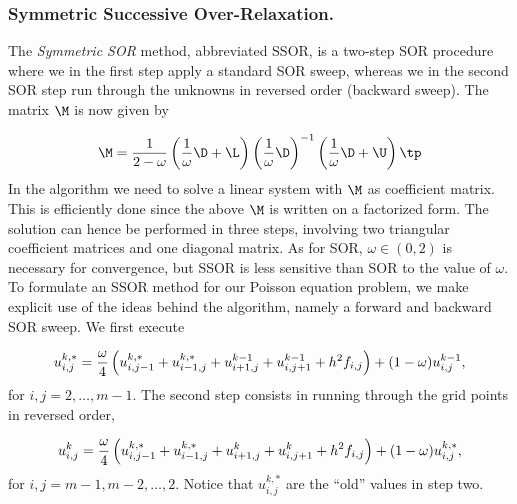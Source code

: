 \subsubsection{Symmetric Successive Over-Relaxation.}
The \emph{Symmetric SOR} method, abbreviated SSOR,
is a two-step SOR procedure where we in the first step
apply a standard SOR sweep, whereas we in the second SOR step run through the
unknowns in reversed order (backward sweep).
The matrix $\M$ is now given by

\begin{equation}
\M = {1\over 2-\omega }\left( {1\over\omega}\D + \L\right)
\left({1\over\omega}\D\right)^{-1}
\left( {1\over\omega}\D + \U\right) \tp
\end{equation}
In the algorithm we need to solve a linear system with $\M$ as
coefficient matrix. This is efficiently done since the above $\M$
is written on a factorized form. The solution can hence be performed
in three steps, involving two triangular coefficient matrices and one
diagonal matrix.
As for SOR, $\omega\in (0,2)$ is necessary for convergence, but
SSOR is less sensitive than SOR to
the value of $\omega$.
To formulate an SSOR method for our Poisson equation problem, we
make explicit use of the ideas behind the algorithm, namely a
forward and backward SOR sweep.
We first execute

\begin{equation}
u^{k,*}_{i,j} = {\omega \over4}\left(
u^{k,*}_{i,j-1} + u^{k,*}_{i-1,j} + u^{k-1}_{i+1,j} + u^{k-1}_{i,j+1}
+ h^2f_{i,j}\right) + (1-\omega )u_{i,j}^{k-1},
\label{linalg2:classic:SSOR2}
\end{equation}
for $i,j=2,\ldots,m-1$.
The second step consists in running through the grid points in reversed
order,

\begin{equation}
u^{k}_{i,j} = {\omega \over4}\left(
u^{k,*}_{i,j-1} + u^{k,*}_{i-1,j} + u^{k}_{i+1,j} + u^{k}_{i,j+1}
+ h^2f_{i,j}\right) + (1-\omega )u_{i,j}^{k,*},
\label{linalg2:classic:SSOR3}
\end{equation}
for $i,j=m-1,m-2,\ldots,2$. Notice that $u_{i,j}^{k,*}$ are the ``old''
values in step two.

